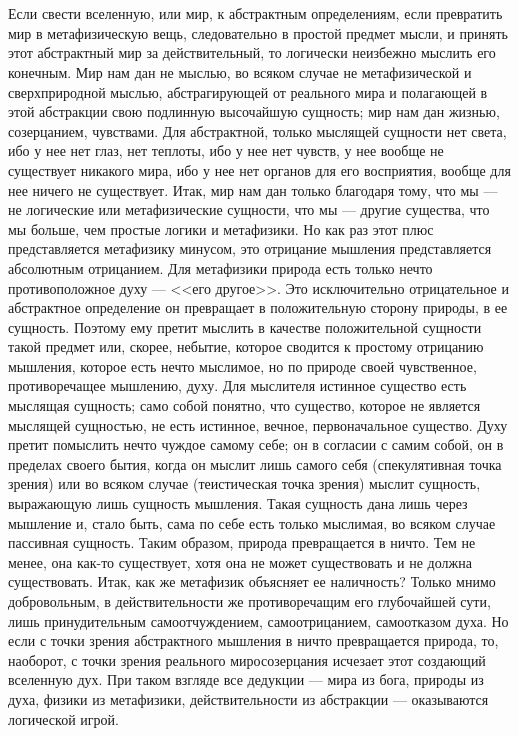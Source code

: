 \documentclass[12pt,oneside]{book}
\begin{document}
\chapter{}

Если свести вселенную, или мир, к абстрактным определениям, если превратить мир в метафизическую вещь, следовательно в простой предмет мысли, и принять этот абстрактный мир за действительный, то логически неизбежно мыслить его конечным. Мир нам дан не мыслью, во всяком случае не метафизической и сверхприродной мыслью, абстрагирующей от реального мира и полагающей в этой абстракции свою подлинную высочайшую сущность; мир нам дан жизнью, созерцанием, чувствами. Для абстрактной, только мыслящей сущности нет света, ибо у нее нет глаз, нет теплоты, ибо у нее нет чувств, у нее вообще не существует никакого мира, ибо у нее нет органов для его восприятия, вообще для нее ничего не существует. Итак, мир нам дан только благодаря тому, что мы --- не логические или метафизические сущности, что мы --- другие существа, что мы больше, чем простые логики и метафизики. Но как раз этот плюс представляется метафизику минусом, это отрицание мышления представляется абсолютным отрицанием. Для метафизики природа есть только нечто противоположное духу --- <<его другое>>. Это исключительно отрицательное и абстрактное определение он превращает в положительную сторону природы, в ее сущность. Поэтому ему претит мыслить в качестве положительной сущности такой предмет или, скорее, небытие, которое сводится к простому отрицанию мышления, которое есть нечто мыслимое, но по природе своей чувственное, противоречащее мышлению, духу. Для мыслителя истинное существо есть мыслящая сущность; само собой понятно, что существо, которое не является мыслящей сущностью, не есть истинное, вечное, первоначальное существо. Духу претит помыслить нечто чуждое самому себе; он в согласии с самим собой, он в пределах своего бытия, когда он мыслит лишь самого себя (спекулятивная точка зрения) или во всяком случае (теистическая точка зрения) мыслит сущность, выражающую лишь сущность мышления. Такая сущность дана лишь через мышление и, стало быть, сама по себе есть только мыслимая, во всяком случае пассивная сущность. Таким образом, природа превращается в ничто. Тем не менее, она как-то существует, хотя она не может существовать и не должна существовать. Итак, как же метафизик объясняет ее наличность? Только мнимо добровольным, в действительности же противоречащим его глубочайшей сути, лишь принудительным самоотчуждением, самоотрицанием, самоотказом духа. Но если с точки зрения абстрактного мышления в ничто превращается природа, то, наоборот, с точки зрения реального миросозерцания исчезает этот создающий вселенную дух. При таком взгляде все дедукции --- мира из бога, природы из духа, физики из метафизики, действительности из абстракции --- оказываются логической игрой.
\end{document}

